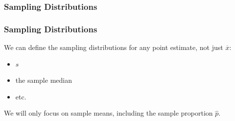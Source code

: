 \documentclass[slides]{beamer}
\newcommand{\blue}[1]{\textcolor{blue2}{#1}}
\newcommand{\xbar}{\overline{x}}
\begin{document}
\begin{frame}[fragile]
\frametitle{Sampling Distributions}

%
%
%
%
%
%

\end{frame}


\begin{frame}[fragile]
\frametitle{Sampling Distributions}

%
%
We can define the sampling distributions for \blue{any} point estimate, not just $\xbar$:
\pause \begin{itemize}
\item $s$
\item the sample median
\item etc.
\end{itemize}

\pause We will only focus on sample means, including the sample proportion $\widehat{p}$.

\end{frame}
\end{document}
